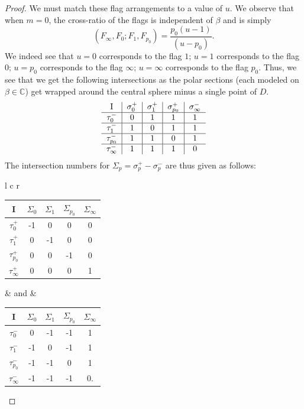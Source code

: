 \documentclass[12pt,letterpaper,reqno]{amsart}
\def\mathbf#1{#1}%
\theoremstyle{remark}
\theoremstyle{definition}
\numberwithin{thm}{section}
\numberwithin{equation}{section}
\numberwithin{figure}{section}
\newcommand{\C}{\ensuremath{\mathbb C}}
\begin{document}
\begin{proof}
We must match these flag arrangements to a value of $u$. 
We observe that when $\mathbf{m}=\mathbf{0}$, the cross-ratio of the flags is independent of $\beta$ and is simply 
\[(F_\infty, F_0; F_1, F_{p_0} ) = \frac{p_0(u-1)}{(u-p_0)}. \]
We indeed see that $u=0$ corresponds to the flag $1$; $u=1$ corresponds to the flag $0$; $u=p_0$ corresponds to the flag $\infty$; $u=\infty$ corresponds to the flag $p_0$. 
Thus, we see that we get the following intersections as the polar sections (each modeled on $\beta \in \C$) get wrapped around the central sphere minus a single point of $D$.
\begin{equation}
\begin{tabular}{  c | c | c |c|c }
    I & $\sigma^+_0$ & $\sigma^+_1$ & $\sigma^+_{p_0}$ & $\sigma^-_\infty$ \\ \hline
    $\tau_0^-$ & 0 & 1 & 1 & 1\\ \hline
    $\tau_1^-$ & 1 & 0 & 1 & 1\\ \hline
    $\tau_{p_0}^-$ & 1 & 1  & 0 & 1\\ \hline
    $\tau_\infty^-$ & 1 & 1  & 1 & 0\\
\end{tabular}
\end{equation}
The intersection numbers for $\Sigma_p = \sigma_p^+- \sigma_p^-$ are thus given as follows:

\begin{center}

\begin{tabular}{l c r}
	
\begin{tabular}{  c | c | c |c|c }
    I & $\Sigma_0$ & $\Sigma_1$ & $\Sigma_{p_0}$ & $\Sigma_\infty$ \\ \hline
    $\tau_0^+$ & -1 & 0 & 0 & 0\\ \hline
    $\tau_1^+$ & 0 & -1 & 0 & 0\\ \hline
    $\tau_{p_0}^+$ & 0 & 0  & -1 & 0\\ \hline
    $\tau_\infty^+$ & 0 & 0  & 0 & 1\\
\end{tabular}

&  and &

\begin{tabular}{  c | c | c |c|c }
    I & $\Sigma_0$ & $\Sigma_1$ & $\Sigma_{p_0}$ & $\Sigma_\infty$ \\ \hline
    $\tau_0^-$ & 0 & -1 & -1 & 1\\ \hline
    $\tau_1^-$ & -1 & 0 & -1 & 1\\ \hline
    $\tau_{p_0}^-$ & -1 & -1  & 0 & 1\\ \hline
    $\tau_\infty^-$ & -1 & -1  & -1 & 0.\\
\end{tabular}


\end{tabular}
\end{center}
\end{proof}
\end{document}
